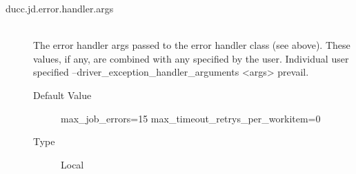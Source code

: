 \begin{description}
        \item[ducc.jd.error.handler.args] \hfill \\
          The error handler args passed to the error handler class (see above).
          These values, if any, are combined with any specified by the user.
          Individual user specified --driver_exception_handler_arguments <args> 
          prevail.
          \begin{description}
            \item[Default Value] max_job_errors=15 max_timeout_retrys_per_workitem=0
            \item[Type] Local
          \end{description}
          
      \end{description}
      
  



